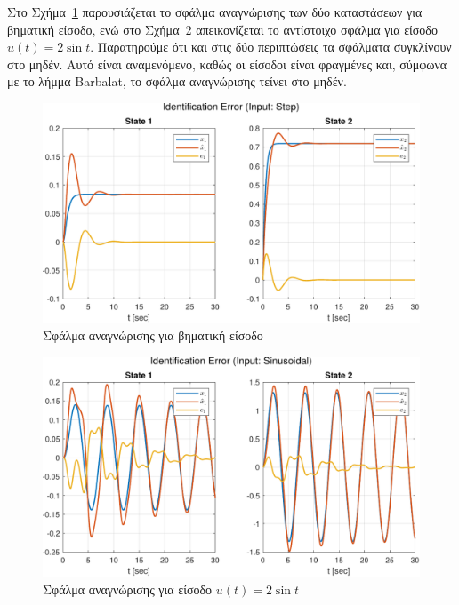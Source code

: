\documentclass[a4paper,12pt]{article}
\begin{document}
Στο Σχήμα~\ref{fig:task1_identification_error_step} παρουσιάζεται το σφάλμα αναγνώρισης των δύο καταστάσεων 
για βηματική είσοδο, ενώ στο Σχήμα~\ref{fig:task1_identification_error_sinusoidal} απεικονίζεται το αντίστοιχο 
σφάλμα για είσοδο $u(t) = 2 \sin t$. Παρατηρούμε ότι και στις δύο περιπτώσεις τα σφάλματα συγκλίνουν στο μηδέν. 
Αυτό είναι αναμενόμενο, καθώς οι είσοδοι είναι φραγμένες και, σύμφωνα με το λήμμα 
Barbalat, το σφάλμα αναγνώρισης τείνει στο μηδέν.

\begin{figure}
    \centering
    \includegraphics[width=1\linewidth]{plot/task1_identification_error_step.pdf}
    \caption{Σφάλμα αναγνώρισης για βηματική είσοδο}
    \label{fig:task1_identification_error_step}
\end{figure}

\begin{figure}
    \centering
    \includegraphics[width=1\linewidth]{plot/task1_identification_error_sinusoidal.pdf}
    \caption{Σφάλμα αναγνώρισης για είσοδο $u(t) = 2 \sin t$}
    \label{fig:task1_identification_error_sinusoidal}
\end{figure}
\end{document}
